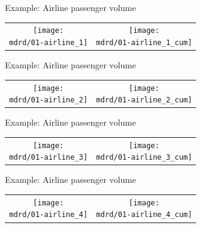 \begin{frame}{Example: Airline passenger volume}
\newcommand{\wmgd}{0.5\columnwidth}
\newcommand{\hmgd}{3.0cm}
\newcommand{\mdrd}{figures/01-airline}
\newcommand{\mbm}{\hspace{-0.3cm}}
{\footnotesize

}

\vspace{\baselineskip}

\begin{tabular}{cc}
\mbm \texttt{[image: \\mdrd/01-airline\_1]} & \texttt{[image: \\mdrd/01-airline\_1\_cum]}
\end{tabular}
\end{frame}

\begin{frame}{Example: Airline passenger volume}
\newcommand{\wmgd}{0.5\columnwidth}
\newcommand{\hmgd}{3.0cm}
\newcommand{\mdrd}{figures/01-airline}
\newcommand{\mbm}{\hspace{-0.3cm}}
{\footnotesize

}

\vspace{\baselineskip}

\begin{tabular}{cc}
\mbm \texttt{[image: \\mdrd/01-airline\_2]} & \texttt{[image: \\mdrd/01-airline\_2\_cum]}
\end{tabular}
\end{frame}

\begin{frame}{Example: Airline passenger volume}
\newcommand{\wmgd}{0.5\columnwidth}
\newcommand{\hmgd}{3.0cm}
\newcommand{\mdrd}{figures/01-airline}
\newcommand{\mbm}{\hspace{-0.3cm}}
{\footnotesize

}

\vspace{\baselineskip}

\begin{tabular}{cc}
\mbm \texttt{[image: \\mdrd/01-airline\_3]} & \texttt{[image: \\mdrd/01-airline\_3\_cum]}
\end{tabular}
\end{frame}

\begin{frame}{Example: Airline passenger volume}
\newcommand{\wmgd}{0.5\columnwidth}
\newcommand{\hmgd}{3.0cm}
\newcommand{\mdrd}{figures/01-airline}
\newcommand{\mbm}{\hspace{-0.3cm}}
{\footnotesize

}

\vspace{\baselineskip}

\begin{tabular}{cc}
\mbm \texttt{[image: \\mdrd/01-airline\_4]} & \texttt{[image: \\mdrd/01-airline\_4\_cum]}
\end{tabular}
\end{frame}

